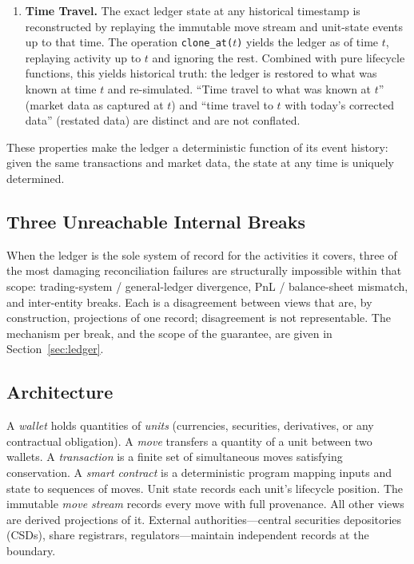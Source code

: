 \documentclass[11pt,a4paper]{article}
\begin{document}
\begin{enumerate}
\item \textbf{Time Travel.} \label{prop:time-travel} The exact ledger state at any historical timestamp is reconstructed by replaying the immutable move stream and unit-state events up to that time. The operation \texttt{clone\_at($t$)} yields the ledger as of time $t$, replaying activity up to $t$ and ignoring the rest. Combined with pure lifecycle functions, this yields historical truth: the ledger is restored to what was known at time $t$ and re-simulated. ``Time travel to what was known at $t$'' (market data as captured at $t$) and ``time travel to $t$ with today's corrected data'' (restated data) are distinct and are not conflated.
\end{enumerate}

These properties make the ledger a deterministic function of its event history: given the same transactions and market data, the state at any time is uniquely determined.

\subsection{Three Unreachable Internal Breaks}

When the ledger is the sole system of record for the activities it covers, three of the most damaging reconciliation failures are structurally impossible within that scope: trading-system / general-ledger divergence, PnL / balance-sheet mismatch, and inter-entity breaks. Each is a disagreement between views that are, by construction, projections of one record; disagreement is not representable. The mechanism per break, and the scope of the guarantee, are given in Section~\ref{sec:ledger}.

\subsection{Architecture}

A \textit{wallet} holds quantities of \textit{units} (currencies, securities, derivatives, or any contractual obligation). A \textit{move} transfers a quantity of a unit between two wallets. A \textit{transaction} is a finite set of simultaneous moves satisfying conservation. A \textit{smart contract} is a deterministic program mapping inputs and state to sequences of moves. Unit state records each unit's lifecycle position. The immutable \textit{move stream} records every move with full provenance. All other views are derived projections of it. External authorities---central securities depositories (CSDs), share registrars, regulators---maintain independent records at the boundary.
\end{document}

